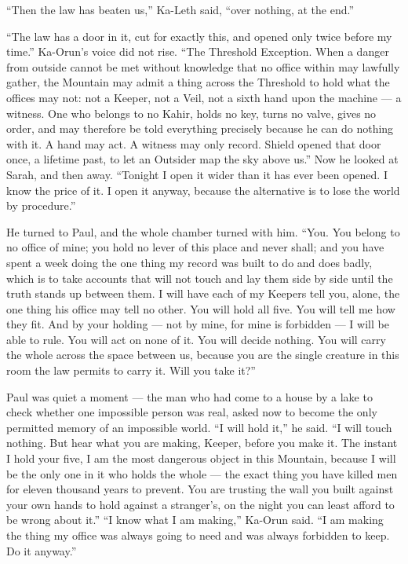 ``Then the law has beaten us,'' Ka-Leth said, ``over nothing, at the end.''\par

``The law has a door in it, cut for exactly this, and opened only twice before my time.'' Ka-Orun's voice did not rise. ``The Threshold Exception. When a danger from outside cannot be met without knowledge that no office within may lawfully gather, the Mountain may admit a thing across the Threshold to hold what the offices may not: not a Keeper, not a Veil, not a sixth hand upon the machine --- a witness. One who belongs to no Kahir, holds no key, turns no valve, gives no order, and may therefore be told everything precisely because he can do nothing with it. A hand may act. A witness may only record. Shield opened that door once, a lifetime past, to let an Outsider map the sky above us.'' Now he looked at Sarah, and then away. ``Tonight I open it wider than it has ever been opened. I know the price of it. I open it anyway, because the alternative is to lose the world by procedure.''\par

He turned to Paul, and the whole chamber turned with him. ``You. You belong to no office of mine; you hold no lever of this place and never shall; and you have spent a week doing the one thing my record was built to do and does badly, which is to take accounts that will not touch and lay them side by side until the truth stands up between them. I will have each of my Keepers tell you, alone, the one thing his office may tell no other. You will hold all five. You will tell me how they fit. And by your holding --- not by mine, for mine is forbidden --- I will be able to rule. You will act on none of it. You will decide nothing. You will carry the whole across the space between us, because you are the single creature in this room the law permits to carry it. Will you take it?''\par

Paul was quiet a moment --- the man who had come to a house by a lake to check whether one impossible person was real, asked now to become the only permitted memory of an impossible world. ``I will hold it,'' he said. ``I will touch nothing. But hear what you are making, Keeper, before you make it. The instant I hold your five, I am the most dangerous object in this Mountain, because I will be the only one in it who holds the whole --- the exact thing you have killed men for eleven thousand years to prevent. You are trusting the wall you built against your own hands to hold against a stranger's, on the night you can least afford to be wrong about it.'' ``I know what I am making,'' Ka-Orun said. ``I am making the thing my office was always going to need and was always forbidden to keep. Do it anyway.''\par

